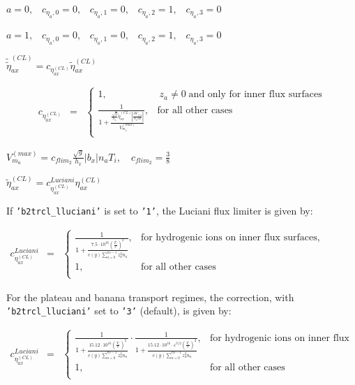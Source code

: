 \documentclass[a4paper,10pt]{report}
\begin{document}
$ a = 0, \;\;\;  c_{\eta _a,0} = 0, \;\;\;  c_{\eta _a,1} = 0, \;\;\;  c_{\eta _a,2} = 1,  \;\;\;  c_{\eta _a,3} = 0$

$ a = 1, \;\;\;  c_{\eta _a,0} = 0, \;\;\;  c_{\eta _a,1} = 0, \;\;\;  c_{\eta _a,2} = 1,  \;\;\;  c_{\eta _a,3} = 0$

$\widetilde{\widetilde{\eta}}^{(CL)}_{ax} = c_{\eta_{ax}^{(CL)}} \widetilde{\eta}^{(CL)}_{ax}$

\begin{equation}
\begin{matrix}
c_{\eta_{ax}^{(CL)}} & =
& \left\{
\begin{matrix}
1, & \ z_a \neq 0 \; \text{and only for inner flux surfaces} \\
\frac 1
{1 + \frac{
\frac{\sqrt g}{h_x} \widetilde{\eta}^{(CL)}_{ax}  \left| \frac{\partial V_{\parallel a}}{h_x \partial x} \right|
}
{V_{m_a}^{(max)}}
}, &
\text{for all other cases} \\
\end{matrix} \right.
\end{matrix}
\end{equation}

$V_{m_a}^{(max)} = c_{flim_2} \frac{\sqrt g}{h_x} |b_x| n_a T_i$, ~ $c_{flim_2} = \frac{3}{8}$

$\widetilde{\eta}^{(CL)}_{ax} = c_{\eta_{ax}^{(CL)}}^{Luciani} \eta^{(CL)}_{ax}$

If {\tt 'b2trcl\_lluciani'} is set to {\tt '1'}, the Luciani flux limiter is given by:

$\begin{matrix}
c_{\eta_{ax}^{(CL)}}^{Luciani} & =
& \left\{
\begin{matrix}
\frac 1 {
1 + \frac{
7.5 \cdot 10^{16} \left( \frac{T_i} e \right)^2}
{c(y) \sum \limits_{a=0}^{ns-1} z_a^2 n_a}
}
, & \text{for hydrogenic ions on inner flux surfaces,} \\
1, & \text{for all other cases} \\
\end{matrix} \right.
\end{matrix}$

For the plateau and banana transport regimes, the correction, with {\tt 'b2trcl\_lluciani'} set to {\tt '3'} (default), is given by:


$
\begin{matrix}
c_{\eta_{ax}^{(CL)}}^{Luciani} & =
& \left\{
\begin{matrix}
\frac 1{1 +
\frac{15.12 \cdot 10^{16} \left( \frac{T_i}e \right)^2}
{c(y)\sum \limits_{a=0}^{ns-1} z_a^2 n_a}}
\cdot
\frac 1{1 +
\frac{15.12 \cdot 10^{16} \cdot \varepsilon^{3/2} \left( \frac{T_i} e \right)^2}
{c(y)\sum \limits_{a=0}^{ns-1} z_a^2 n_a}}
, & \text{for hydrogenic ions on inner flux surfaces,} \\
1, & \text{for all other cases} \\
\end{matrix} \right.
\end{matrix}
$
\end{document}
